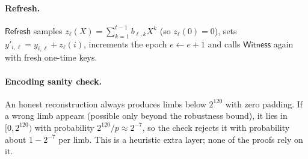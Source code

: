 \documentclass[11pt,a4paper]{article}
\theoremstyle{plain}
\theoremstyle{definition}
\begin{document}
\paragraph{Refresh.} $\mathsf{Refresh}$ samples $z_\ell(X)=\sum_{k=1}^{t-1}b_{\ell,k}X^k$ (so
$z_\ell(0)=0$), sets $y'_{i,\ell}=y_{i,\ell}+z_\ell(i)$, increments the epoch $e\gets e+1$ and calls
$\mathsf{Witness}$ again with fresh one-time keys.

\paragraph{Encoding sanity check.} An honest reconstruction always produces limbs below $2^{120}$
with zero padding. If a wrong limb appears (possible only beyond the robustness bound), it lies in
$[0,2^{120})$ with probability $2^{120}/p\approx2^{-7}$, so the check rejects it with probability
about $1-2^{-7}$ per limb. This is a heuristic extra layer; none of the proofs rely on it.
\end{document}
